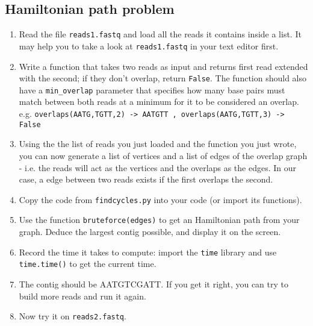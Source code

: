 \documentclass[a4paper,11pt]{article}
\begin{document}
\subsection{Hamiltonian path problem}
\begin{enumerate}
\item Read the file \texttt{reads1.fastq} and load all the reads it contains inside a list. It may help you to take a look at \texttt{reads1.fastq} in your text editor first.
\item Write a function that takes two reads as input and returns first read extended with the second; if they don't overlap, return \texttt{False}. The function should also have a \texttt{min\_overlap} parameter that specifies how many base pairs must match between both reads at a minimum for it to be considered an overlap. \\
e.g. \texttt{overlaps(AATG,TGTT,2) -> AATGTT , overlaps(AATG,TGTT,3) -> False}
\item Using the the list of reads you just loaded and the function you just wrote, you can now generate a list of vertices and a list of edges of the overlap graph - i.e. the reads will act as the vertices and the overlaps as the edges. In our case, a edge between two reads exists if the first overlaps the second.
\item Copy the code from \texttt{findcycles.py} into your code (or import its functions).
\item Use the function \texttt{bruteforce(edges)} to get an Hamiltonian path from your graph. Deduce the largest contig possible, and display it on the screen.
\item Record the time it takes to compute: import the \texttt{time} library and use \texttt{time.time()} to get the current time.
\item The contig should be AATGTCGATT. If you get it right, you can try to build more reads and run it again.
\item Now try it on \texttt{reads2.fastq}.
\end{enumerate}
\end{document}

